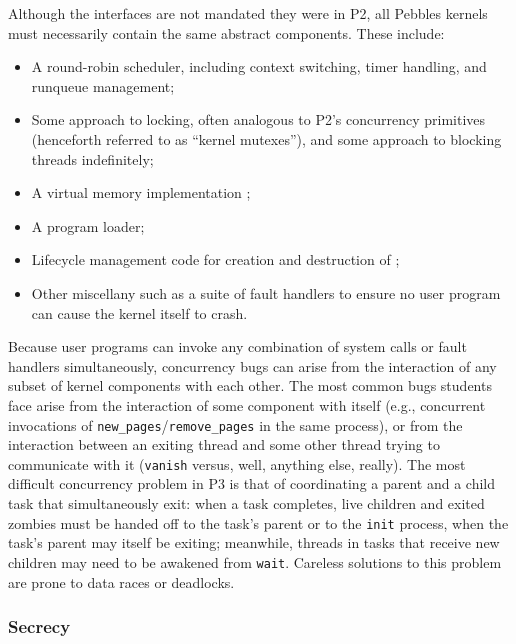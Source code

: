 Although the interfaces are not mandated  they were in P2, all Pebbles kernels must necessarily contain the same abstract components. These include:
\begin{itemize}
	\item A round-robin scheduler, including context switching, timer handling, and runqueue management;
	\item Some approach to locking, often analogous to P2's concurrency primitives (henceforth referred to as ``kernel mutexes''),
		and some approach to blocking threads indefinitely;
	\item A virtual memory implementation ;
	\item A program loader;
	\item Lifecycle management code for creation and destruction of ;
	\item Other miscellany such as a suite of fault handlers to ensure no user program can cause the kernel itself to crash.
\end{itemize}
Because user programs can invoke any combination of system calls or fault handlers simultaneously,
concurrency bugs can arise from the interaction of any subset of kernel components with each other.
The most common bugs students face arise from the interaction of some component with itself (e.g., concurrent invocations of {\tt new\_pages}/{\tt remove\_pages} in the same process),
or from the interaction between an exiting thread and some other thread trying to communicate with it ({\tt vanish} versus, well, anything else, really).
The most difficult concurrency problem in P3 is that of coordinating a parent and a child task that simultaneously exit:
when a task completes, live children and exited zombies must be handed off to the task's parent or to the {\tt init} process,
when the task's parent may itself be exiting;
meanwhile, threads in tasks that receive new children may need to be awakened from {\tt wait}.
Careless solutions to this problem are prone to data races or deadlocks.


\subsubsection{Secrecy}
\label{sec:410-secrecy}

